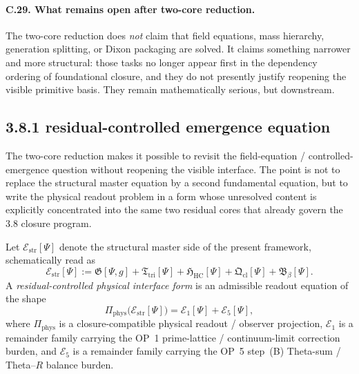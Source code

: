 \paragraph{C.29. What remains open after two-core reduction.}
The two-core reduction does \emph{not} claim that field equations, mass hierarchy, generation splitting, or Dixon packaging are solved. It claims something narrower and more structural: those tasks no longer appear first in the dependency ordering of foundational closure, and they do not presently justify reopening the visible primitive basis. They remain mathematically serious, but downstream.

\subsection*{3.8.1 residual-controlled emergence equation}
The two-core reduction makes it possible to revisit the field-equation / controlled-emergence question without reopening the visible interface. The point is not to replace the structural master equation by a second fundamental equation, but to write the physical readout problem in a form whose unresolved content is explicitly concentrated into the same two residual cores that already govern the 3.8 closure program.

\begin{definition}
\label{def:mainline-3810}
Let \(\mathcal E_{\mathrm{str}}[\Psi]\) denote the structural master side of the present framework, schematically read as
\[
  \mathcal E_{\mathrm{str}}[\Psi]
  :=
  \mathfrak G[\Psi,g]
  + \mathfrak T_{\mathrm{tri}}[\Psi]
  + \mathfrak H_{\mathrm{HC}}[\Psi]
  + \mathfrak Q_{\mathrm{cl}}[\Psi]
  + \mathfrak B_{\beta}[\Psi].
\]
A \emph{residual-controlled physical interface form} is an admissible readout equation of the shape
\[
  \Pi_{\mathrm{phys}}\bigl(\mathcal E_{\mathrm{str}}[\Psi]\bigr)
  =
  \mathcal E_{1}[\Psi]
  +
  \mathcal E_{5}[\Psi],
\]
where \(\Pi_{\mathrm{phys}}\) is a closure-compatible physical readout / observer projection, \(\mathcal E_{1}\) is a remainder family carrying the OP~1 prime-lattice / continuum-limit correction burden, and \(\mathcal E_{5}\) is a remainder family carrying the OP~5 step~(B) Theta-sum / Theta--\(R\) balance burden.
\end{definition}

